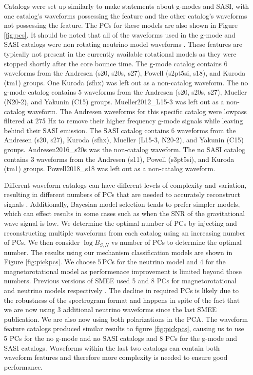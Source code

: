 \documentclass[letterpaper, aps, prd, twocolumn, superscriptaddress, showpacs, nofootinbib]{revtex4}
\begin{document}
Catalogs were set up similarly to make statements about g-modes and SASI, with one catalog's waveforms possessing the feature and the other catalog's waveforms not possessing the feature. The PCs for these models are also shown in Figure \ref{fig:pcs}. It should be noted that all of the waveforms used in the g-mode and SASI catalogs were non rotating neutrino model waveforms \cite{mueller:e12, kuroda:16, andresen:16, 2017arXiv170107325Y}. These features are typically not present in the currently available rotational models as they were stopped shortly after the core bounce time. The g-mode catalog contains 6 waveforms from the Andresen (s20, s20s, s27), Powell (s2pt5si, s18), and Kuroda (tm1) groups. One Kuroda (sfhx) was left out as a non-catalog waveform. The no g-mode catalog contains 5 waveforms from the Andresen (s20, s20s, s27), Mueller (N20-2), and Yakunin (C15) groups. Mueller2012\_L15-3 was left out as a non-catalog waveform. The Andresen waveforms for this specific catalog were lowpass filtered at 275 Hz to remove their higher frequency g-mode signals while leaving behind their SASI emission. The SASI catalog contains 6 waveforms from the Andresen (s20, s27), Kuroda (sfhx), Mueller (L15-3, N20-2), and Yakunin (C15) groups. Andresen2016\_s20s was the non-catalog waveform. The no SASI catalog contains 3 waveforms from the Andresen (s11), Powell (s3pt5si), and Kuroda (tm1) groups. Powell2018\_s18 was left out as a non-catalog waveform.

Different waveform catalogs can have different levels of complexity and variation, resulting in different numbers of PCs that are needed to accurately reconstruct signals \cite{logue:12, powell:16b, 2017PhRvD..96l3013P}. Additionally, Bayesian model selection tends to prefer simpler models, which can effect results in some cases such as when the SNR of the gravitational wave signal is low. We determine the optimal number of PCs by injecting and reconstructing multiple waveforms from each catalog using an increasing number of PCs. We then consider $\log B_{S,N}$ vs number of PCs to determine the optimal number. The results using our mechanism classification models are shown in Figure \ref{fig:pickpcs}. We choose 5\,PCs for the neutrino model and 4 for the magnetorotational model as performenace improvement is limited beyond those numbers. Previous versions of SMEE used 5 and 8 PCs for magnetorotational and neutrino models respectively \cite{2017PhRvD..96l3013P}. The decline in required PCs is likely due to the robustness of the spectrogram format and happens in spite of the fact that we are now using 3 additional neutrino waveforms since the last SMEE publication. We are also now using both polarizations in the PCA. The waveform feature catalogs produced similar results to figure \ref{fig:pickpcs}, causing us to use 5 PCs for the no g-mode and no SASI catalogs and 8 PCs for the g-mode and SASI catalogs. Waveforms within the last two catalogs can contain both waveform features and therefore more complexity is needed to ensure good performance.
\end{document}
